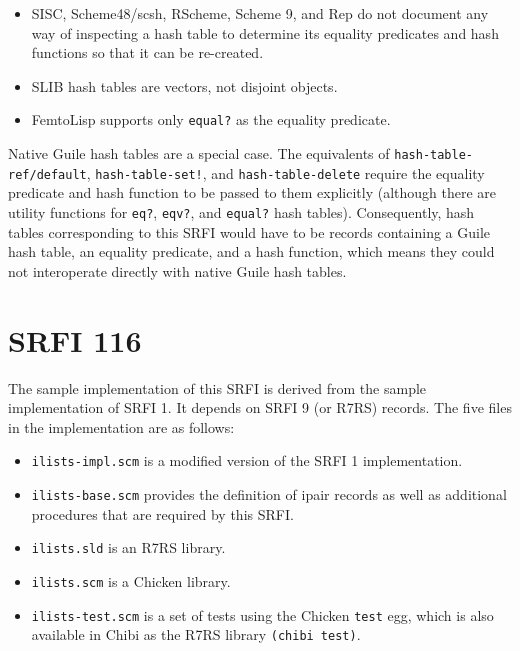 \begin{itemize}
\tightlist
\item
  SISC, Scheme48/scsh, RScheme, Scheme 9, and Rep do not document any
  way of inspecting a hash table to determine its equality predicates
  and hash functions so that it can be re-created.
\end{itemize}

\begin{itemize}
\tightlist
\item
  SLIB hash tables are vectors, not disjoint objects.
\end{itemize}

\begin{itemize}
\tightlist
\item
  FemtoLisp supports only \texttt{equal?} as the equality predicate.
\end{itemize}

Native Guile hash tables are a special case. The equivalents of
\texttt{hash-table-ref/default}, \texttt{hash-table-set!}, and
\texttt{hash-table-delete} require the equality predicate and hash
function to be passed to them explicitly (although there are utility
functions for \texttt{eq?}, \texttt{eqv?}, and \texttt{equal?} hash
tables). Consequently, hash tables corresponding to this SRFI would have
to be records containing a Guile hash table, an equality predicate, and
a hash function, which means they could not interoperate directly with
native Guile hash tables.

\section{SRFI 116}

The sample implementation of this SRFI is derived from the sample
implementation of SRFI 1. It depends on SRFI 9 (or R7RS) records. The
five files in the implementation are as follows:

\begin{itemize}
\tightlist
\item
  \texttt{ilists-impl.scm} is a modified version of the SRFI 1
  implementation.
\item
  \texttt{ilists-base.scm} provides the definition of ipair records as
  well as additional procedures that are required by this SRFI.
\item
  \texttt{ilists.sld} is an R7RS library.
\item
  \texttt{ilists.scm} is a Chicken library.
\item
  \texttt{ilists-test.scm} is a set of tests using the Chicken
  \texttt{test} egg, which is also available in Chibi as the R7RS
  library \texttt{(chibi\ test)}.
\end{itemize}


